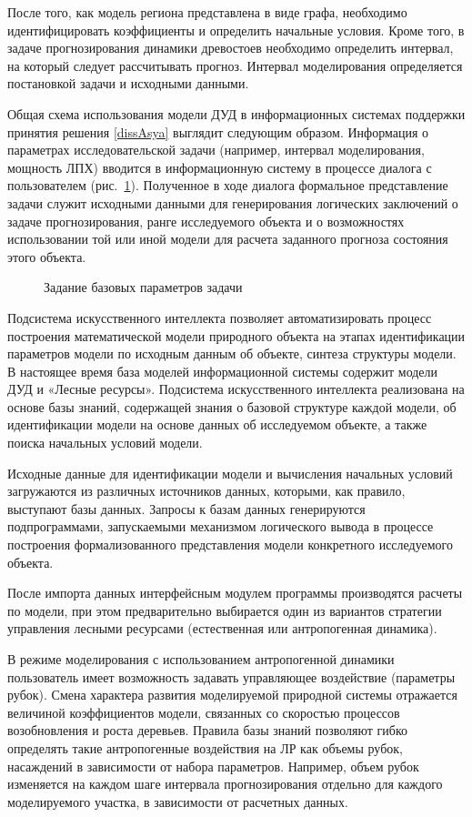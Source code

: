 После того, как модель региона представлена в виде графа, необходимо идентифицировать коэффициенты и определить начальные условия. Кроме того, в задаче прогнозирования динамики древостоев необходимо определить интервал, на который следует рассчитывать прогноз. Интервал моделирования определяется постановкой задачи и исходными данными.

Общая схема использования модели ДУД в информационных системах поддержки принятия решения \ref{dissAsya} выглядит следующим образом. Информация о параметрах исследовательской задачи (например, интервал моделирования, мощность ЛПХ) вводится в информационную систему в процессе диалога с пользователем (рис.~\ref{pic:basic_task_params}). Полученное в ходе диалога формальное представление задачи служит исходными данными для генерирования логических заключений о задаче прогнозирования, ранге исследуемого объекта и о возможностях использовании той или иной модели для расчета заданного прогноза состояния этого объекта.

\begin{figure}
\caption{Задание базовых параметров задачи}\label{pic:basic_task_params}
\end{figure}

Подсистема искусственного интеллекта позволяет автоматизировать процесс построения математической модели природного объекта на этапах идентификации параметров модели по исходным данным об объекте, синтеза структуры модели. В настоящее время база моделей информационной системы содержит модели ДУД и «Лесные ресурсы». Подсистема искусственного интеллекта реализована на основе базы знаний, содержащей знания о базовой структуре каждой модели, об идентификации модели на основе данных об исследуемом объекте, а также поиска начальных условий модели.

Исходные данные для идентификации модели и вычисления начальных условий загружаются из различных источников данных, которыми, как правило, выступают базы данных. Запросы к базам данных генерируются подпрограммами, запускаемыми механизмом логического вывода в процессе построения формализованного представления модели конкретного исследуемого объекта.

После импорта данных интерфейсным модулем программы производятся расчеты по модели, при этом предварительно выбирается один из вариантов стратегии управления лесными ресурсами (естественная или антропогенная динамика).

В режиме моделирования с использованием антропогенной динамики пользователь имеет возможность задавать управляющее воздействие (параметры рубок). Смена характера развития моделируемой природной системы отражается величиной коэффициентов модели, связанных со скоростью процессов возобновления и роста деревьев. Правила базы знаний позволяют гибко определять такие антропогенные воздействия на ЛР как объемы рубок, насаждений в зависимости от набора параметров. Например, объем рубок изменяется на каждом шаге интервала прогнозирования отдельно для каждого моделируемого участка, в зависимости от расчетных данных.

